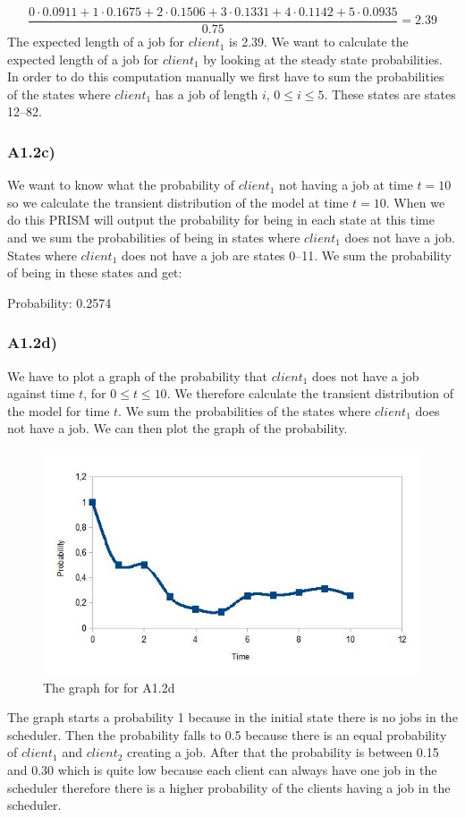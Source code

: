 \documentclass[12pt]{report}
\begin{document}
$$\frac{0 \cdot 0.0911 + 1 \cdot 0.1675 + 2 \cdot 0.1506 + 3 \cdot 0.1331 + 4 \cdot 0.1142 + 5 \cdot 0.0935}{0.75} = 2.39$$
The expected length of a job for $client_1$ is 2.39.
We want to calculate the expected length of a job for $client_1$ by looking at the steady state probabilities. In order to do this computation manually we first have to sum the probabilities of the states where $client_1$ has a job of length $i$, $0 \leq i \leq 5$. These states are states 12--82.

\subsubsection*{A1.2c)}
We want to know what the probability of $client_1$ not having a job at time $t = 10$ so we calculate the transient distribution of the model at time $t = 10$. When we do this PRISM will output the probability for being in each state at this time and we sum the probabilities of being in states where $client_1$ does not have a job. States where $client_1$ does not have a job are states 0--11. We sum the probability of being in these states and get:
\begin{center}
Probability: 0.2574
\end{center}

\subsubsection*{A1.2d)}
We have to plot a graph of the probability that $client_1$ does not have a job against time $t$, for $0 \leq t \leq 10$. We therefore calculate the transient distribution of the model for time $t$. We sum the probabilities of the states where $client_1$ does not have a job. We can then plot the graph of the probability.\\
\begin{figure}[H]
	\centering
	\includegraphics[scale=0.9]{../GFX/A1-2d.png}
	\caption{The graph for for A1.2d}
\end{figure}
The graph starts a probability 1 because in the initial state there is no jobs in the scheduler. Then the probability falls to 0.5 because there is an equal probability of $client_1$ and $client_2$ creating a job. After that the probability is between 0.15 and 0.30 which is quite low because each client can always have one job in the scheduler therefore there is a higher probability of the clients having a job in the scheduler.
\end{document}
